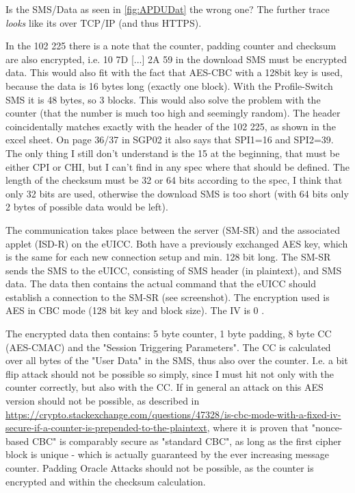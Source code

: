 Is the SMS/Data as seen in \ref{fig:APDUDat} the wrong one? The further trace \textit{looks} like its over TCP/IP (and thus HTTPS).

In the 102 225 \parencite{TS102:225} there is a note that the counter, padding counter and checksum are also encrypted, i.e. 10 7D [...] 2A 59 in the download SMS must be encrypted data. This would also fit with the fact that AES-CBC with a 128bit key is used, because the data is 16 bytes long (exactly one block). With the Profile-Switch SMS it is 48 bytes, so 3 blocks. This would also solve the problem with the counter (that the number is much too high and seemingly random).
The header coincidentally matches exactly with the header of the 102 225, as shown in the excel sheet. On page 36/37 in SGP02 it also says that SPI1=16 and SPI2=39. The only thing I still don't understand is the 15 at the beginning, that must be either CPI or CHI, but I can't find in any spec where that should be defined.
The length of the checksum must be 32 or 64 bits according to the spec, I think that only 32 bits are used, otherwise the download SMS is too short (with 64 bits only 2 bytes of possible data would be left).

The communication takes place between the server (SM-SR) and the associated applet (ISD-R) on the eUICC. Both have a previously exchanged AES key, which is the same for each new connection setup and min. 128 bit long.
The SM-SR sends the SMS to the eUICC, consisting of SMS header (in plaintext), and SMS data. The data then contains the actual command that the eUICC should establish a connection to the SM-SR (see screenshot).  
The encryption used is AES in CBC mode (128 bit key and block size). The IV is 0 \parencite{TS102:225}. 
 
The encrypted data then contains: 5 byte counter, 1 byte padding, 8 byte CC (AES-CMAC) and the "Session Triggering Parameters". The CC is calculated over all bytes of the "User Data" in the SMS, thus also over the counter. I.e. a bit flip attack should not be possible so simply, since I must hit not only with the counter correctly, but also with the CC.
If in general an attack on this AES version should not be possible, as described in \url{https://crypto.stackexchange.com/questions/47328/is-cbc-mode-with-a-fixed-iv-secure-if-a-counter-is-prepended-to-the-plaintext}, where it is proven that "nonce-based CBC" is comparably secure as "standard CBC", as long as the first cipher block is unique - which is actually guaranteed by the ever increasing message counter. 
Padding Oracle Attacks should not be possible, as the counter is encrypted and within the checksum calculation.

